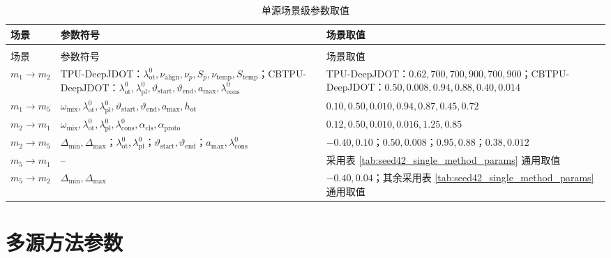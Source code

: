 \documentclass{seuthesis-2022}
\begin{document}
{
\setlength{\tabcolsep}{3.5pt}
\renewcommand{\arraystretch}{1.16}
\begin{longtable}{@{}>{\raggedright\arraybackslash}p{}>{\raggedright\arraybackslash}p{}>{\raggedright\arraybackslash}p{}@{}}
    \caption{单源场景级参数取值}
    \label{tab:seed42_cbtpu_scene_overrides}\\
    \toprule
    场景 & 参数符号 & 场景取值 \\
    \midrule
    \endfirsthead
    \multicolumn{3}{r}{续表~\thetable}\\
    \toprule
    场景 & 参数符号 & 场景取值 \\
    \midrule
    \endhead
    \bottomrule
    \endfoot
    \bottomrule
    \endlastfoot

    $m_1\rightarrow m_2$ & TPU-DeepJDOT：$\lambda_{\mathrm{ot}}^0,\nu_{\mathrm{align}},\nu_p,S_p,\nu_{\mathrm{temp}},S_{\mathrm{temp}}$；CBTPU-DeepJDOT：$\lambda_{\mathrm{ot}}^0,\lambda_{\mathrm{pl}}^0,\vartheta_{\mathrm{start}},\vartheta_{\mathrm{end}},a_{\max},\lambda_{\mathrm{cons}}^0$ & TPU-DeepJDOT：$0.62,700,700,900,700,900$；CBTPU-DeepJDOT：$0.50,0.008,0.94,0.88,0.40,0.014$ \\
    $m_1\rightarrow m_5$ & $\omega_{\mathrm{mix}},\lambda_{\mathrm{ot}}^0,\lambda_{\mathrm{pl}}^0,\vartheta_{\mathrm{start}},\vartheta_{\mathrm{end}},a_{\max},h_{\mathrm{ot}}$ & $0.10,0.50,0.010,0.94,0.87,0.45,0.72$ \\
    $m_2\rightarrow m_1$ & $\omega_{\mathrm{mix}},\lambda_{\mathrm{ot}}^0,\lambda_{\mathrm{pl}}^0,\lambda_{\mathrm{cons}}^0,\alpha_{\mathrm{cls}},\alpha_{\mathrm{proto}}$ & $0.12,0.50,0.010,0.016,1.25,0.85$ \\
    $m_2\rightarrow m_5$ & $\Delta_{\min},\Delta_{\max}$；$\lambda_{\mathrm{ot}}^0,\lambda_{\mathrm{pl}}^0$；$\vartheta_{\mathrm{start}},\vartheta_{\mathrm{end}}$；$a_{\max},\lambda_{\mathrm{cons}}^0$ & $-0.40,0.10$；$0.50,0.008$；$0.95,0.88$；$0.38,0.012$ \\
    $m_5\rightarrow m_1$ & -- & 采用表 \ref{tab:seed42_single_method_params} 通用取值 \\
    $m_5\rightarrow m_2$ & $\Delta_{\min},\Delta_{\max}$ & $-0.40,0.04$；其余采用表 \ref{tab:seed42_single_method_params} 通用取值 \\
\end{longtable}
}

\section{多源方法参数}
\end{document}
